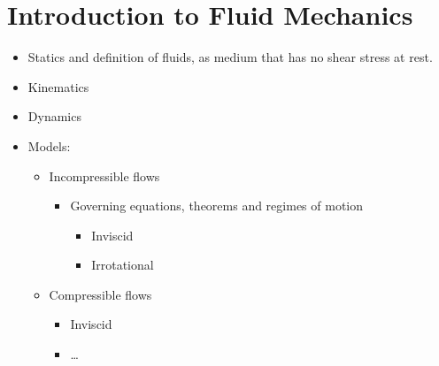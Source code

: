 \documentclass[letterpaper,10pt,english]{jupyterBook}
\begin{document}
\chapter{Introduction to Fluid Mechanics}
\label{\detokenize{ch/fluids/intro:introduction-to-fluid-mechanics}}\label{\detokenize{ch/fluids/intro:fluid-mechanics-intro}}\label{\detokenize{ch/fluids/intro::doc}}\begin{itemize}
\item {} 
\sphinxAtStartPar
Statics and definition of fluids, as medium that has no shear stress at rest.

\item {} 
\sphinxAtStartPar
Kinematics

\item {} 
\sphinxAtStartPar
Dynamics

\item {} 
\sphinxAtStartPar
Models:
\begin{itemize}
\item {} 
\sphinxAtStartPar
Incompressible flows
\begin{itemize}
\item {} 
\sphinxAtStartPar
Governing equations, theorems and regimes of motion
\begin{itemize}
\item {} 
\sphinxAtStartPar
Inviscid

\item {} 
\sphinxAtStartPar
Irrotational

\end{itemize}

\end{itemize}

\item {} 
\sphinxAtStartPar
Compressible flows
\begin{itemize}
\item {} 
\sphinxAtStartPar
Inviscid

\item {} 
\sphinxAtStartPar
…

\end{itemize}

\end{itemize}

\end{itemize}

\sphinxstepscope
\end{document}
